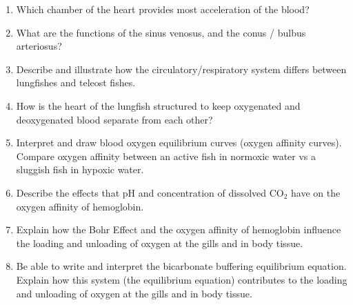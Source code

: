 \documentclass[letterpaper]{tufte-handout}
\begin{document}
\begin{enumerate}
	\item Which chamber of the heart provides most acceleration of the blood? 

	\item What are the functions of the sinus venosus, and the conus / bulbus arteriosus?
	
	\item Describe and illustrate how the circulatory/respiratory system differs between lungfishes and teleost fishes.
	
	\item How is the heart of the lungfish structured to keep oxygenated and deoxygenated blood separate from each other?
	
	\item Interpret and draw blood oxygen equilibrium curves (oxygen affinity curves).  Compare oxygen affinity between an active fish in normoxic water vs a sluggish fish in hypoxic water.
	
	\item Describe the effects that pH and concentration of dissolved CO$_2$ have on the oxygen affinity of hemoglobin.
	
	\item Explain how the Bohr Effect and the oxygen affinity of hemoglobin influence the loading and unloading of oxygen at the gills and in body tissue.
	
	\item Be able to write and interpret the bicarbonate buffering equilibrium equation. Explain how this system (the equilibrium equation) contributes to the loading and unloading of oxygen at the gills and in body tissue.  
\end{enumerate}
\end{document}
